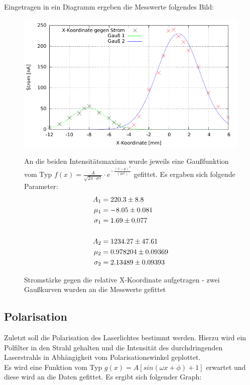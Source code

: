 Eingetragen in ein Diagramm ergeben die Messwerte folgendes Bild:

\begin{figure}[htbp]
\includegraphics[scale=1]{../gnu/Draht.pdf}
\caption{Stromstärke gegen die relative X-Koordinate aufgetragen - zwei Gaußkurven wurden an die Messwerte gefittet}

An die beiden Intensitätsmaxima wurde jeweils eine Gaußfunktion vom Typ $f(x)=\frac{A}{\sqrt{2\pi \cdot \sigma ^2}} \cdot e^{-\frac{(x-\mu )^2}{(2\sigma^2)}}$ gefittet. Es ergaben sich folgende Parameter:
\begin{align*}
A_1&= 220.3 		\pm 	8.8       	\\
\mu_1 &=-8.05	\pm	 	0.081    	\\
\sigma_1&=1.69    \pm		0.077    \\
\vspace{0.5cm}\\
A_2&=1234.27          \pm 47.61	\\
\mu_2 &=0.978204         \pm 0.09369	\\
\sigma_2&=2.13489         \pm 0.09393
\end{align*}
\end{figure}

\subsection{Polarisation}
Zuletzt soll die Polarisation des Laserlichtes bestimmt werden. Hierzu wird ein Polfilter in den Strahl gehalten und die Intensität des durchdringenden Laserstrahls in Abhängigkeit vom Polarisationswinkel geplottet.\\
Es wird eine Funktion vom Typ $g(x)=A\left[sin(\omega x+\phi)+1\right]$ erwartet und diese wird an die Daten gefittet. Es ergibt sich folgender Graph:

